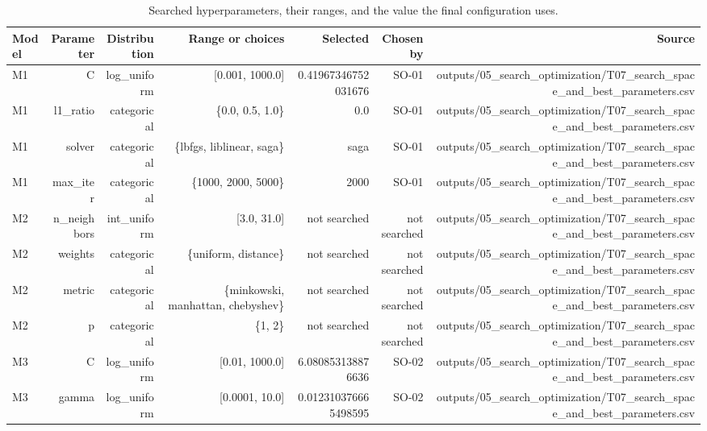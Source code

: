 \begin{table}[htbp]
  \centering
  \caption{Searched hyperparameters, their ranges, and the value the final configuration uses.}
  \label{tab:q1_t03}
  \begin{tabular}{lrrrrrr}
    \toprule
    Model & Parameter & Distribution & Range or choices & Selected & Chosen by & Source \\
    \midrule
    M1 & C & log\_uniform & [0.001, 1000.0] & 0.41967346752031676 & SO-01 & outputs/05\_search\_optimization/T07\_search\_space\_and\_best\_parameters.csv \\
    M1 & l1\_ratio & categorical & \{0.0, 0.5, 1.0\} & 0.0 & SO-01 & outputs/05\_search\_optimization/T07\_search\_space\_and\_best\_parameters.csv \\
    M1 & solver & categorical & \{lbfgs, liblinear, saga\} & saga & SO-01 & outputs/05\_search\_optimization/T07\_search\_space\_and\_best\_parameters.csv \\
    M1 & max\_iter & categorical & \{1000, 2000, 5000\} & 2000 & SO-01 & outputs/05\_search\_optimization/T07\_search\_space\_and\_best\_parameters.csv \\
    M2 & n\_neighbors & int\_uniform & [3.0, 31.0] & not searched & not searched & outputs/05\_search\_optimization/T07\_search\_space\_and\_best\_parameters.csv \\
    M2 & weights & categorical & \{uniform, distance\} & not searched & not searched & outputs/05\_search\_optimization/T07\_search\_space\_and\_best\_parameters.csv \\
    M2 & metric & categorical & \{minkowski, manhattan, chebyshev\} & not searched & not searched & outputs/05\_search\_optimization/T07\_search\_space\_and\_best\_parameters.csv \\
    M2 & p & categorical & \{1, 2\} & not searched & not searched & outputs/05\_search\_optimization/T07\_search\_space\_and\_best\_parameters.csv \\
    M3 & C & log\_uniform & [0.01, 1000.0] & 6.080853138876636 & SO-02 & outputs/05\_search\_optimization/T07\_search\_space\_and\_best\_parameters.csv \\
    M3 & gamma & log\_uniform & [0.0001, 10.0] & 0.012310376665498595 & SO-02 & outputs/05\_search\_optimization/T07\_search\_space\_and\_best\_parameters.csv \\

\end{tabular}
\end{table}

